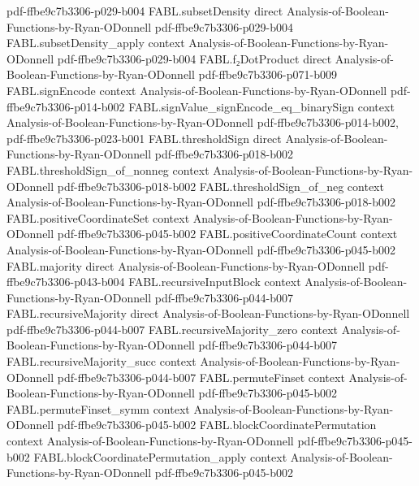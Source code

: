 \begin{theorem}
  {pdf-ffbe9c7b3306-p029-b004}
\proofstep
  {FABL.subsetDensity}
  {direct}
  {Analysis-of-Boolean-Functions-by-Ryan-ODonnell}
  {pdf-ffbe9c7b3306-p029-b004}
\proofstep
  {FABL.subsetDensity_apply}
  {context}
  {Analysis-of-Boolean-Functions-by-Ryan-ODonnell}
  {pdf-ffbe9c7b3306-p029-b004}
\proofstep
  {FABL.f₂DotProduct}
  {direct}
  {Analysis-of-Boolean-Functions-by-Ryan-ODonnell}
  {pdf-ffbe9c7b3306-p071-b009}
\proofstep
  {FABL.signEncode}
  {context}
  {Analysis-of-Boolean-Functions-by-Ryan-ODonnell}
  {pdf-ffbe9c7b3306-p014-b002}
\proofstep
  {FABL.signValue_signEncode_eq_binarySign}
  {context}
  {Analysis-of-Boolean-Functions-by-Ryan-ODonnell}
  {pdf-ffbe9c7b3306-p014-b002,
    pdf-ffbe9c7b3306-p023-b001}
\proofstep
  {FABL.thresholdSign}
  {direct}
  {Analysis-of-Boolean-Functions-by-Ryan-ODonnell}
  {pdf-ffbe9c7b3306-p018-b002}
\proofstep
  {FABL.thresholdSign_of_nonneg}
  {context}
  {Analysis-of-Boolean-Functions-by-Ryan-ODonnell}
  {pdf-ffbe9c7b3306-p018-b002}
\proofstep
  {FABL.thresholdSign_of_neg}
  {context}
  {Analysis-of-Boolean-Functions-by-Ryan-ODonnell}
  {pdf-ffbe9c7b3306-p018-b002}
\proofstep
  {FABL.positiveCoordinateSet}
  {context}
  {Analysis-of-Boolean-Functions-by-Ryan-ODonnell}
  {pdf-ffbe9c7b3306-p045-b002}
\proofstep
  {FABL.positiveCoordinateCount}
  {context}
  {Analysis-of-Boolean-Functions-by-Ryan-ODonnell}
  {pdf-ffbe9c7b3306-p045-b002}
\proofstep
  {FABL.majority}
  {direct}
  {Analysis-of-Boolean-Functions-by-Ryan-ODonnell}
  {pdf-ffbe9c7b3306-p043-b004}
\proofstep
  {FABL.recursiveInputBlock}
  {context}
  {Analysis-of-Boolean-Functions-by-Ryan-ODonnell}
  {pdf-ffbe9c7b3306-p044-b007}
\proofstep
  {FABL.recursiveMajority}
  {direct}
  {Analysis-of-Boolean-Functions-by-Ryan-ODonnell}
  {pdf-ffbe9c7b3306-p044-b007}
\proofstep
  {FABL.recursiveMajority_zero}
  {context}
  {Analysis-of-Boolean-Functions-by-Ryan-ODonnell}
  {pdf-ffbe9c7b3306-p044-b007}
\proofstep
  {FABL.recursiveMajority_succ}
  {context}
  {Analysis-of-Boolean-Functions-by-Ryan-ODonnell}
  {pdf-ffbe9c7b3306-p044-b007}
\proofstep
  {FABL.permuteFinset}
  {context}
  {Analysis-of-Boolean-Functions-by-Ryan-ODonnell}
  {pdf-ffbe9c7b3306-p045-b002}
\proofstep
  {FABL.permuteFinset_symm}
  {context}
  {Analysis-of-Boolean-Functions-by-Ryan-ODonnell}
  {pdf-ffbe9c7b3306-p045-b002}
\proofstep
  {FABL.blockCoordinatePermutation}
  {context}
  {Analysis-of-Boolean-Functions-by-Ryan-ODonnell}
  {pdf-ffbe9c7b3306-p045-b002}
\proofstep
  {FABL.blockCoordinatePermutation_apply}
  {context}
  {Analysis-of-Boolean-Functions-by-Ryan-ODonnell}
  {pdf-ffbe9c7b3306-p045-b002}

\end{theorem}
